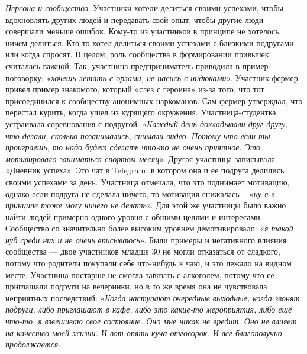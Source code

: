 \documentclass[pdflatex,sn-mathphys-num]{sn-jnl}%
\theoremstyle{thmstyleone}%
\theoremstyle{thmstyletwo}%
\theoremstyle{thmstylethree}%
\begin{document}
\textit{Персона и сообщество}. Участники хотели делиться своими успехами, чтобы вдохновлять других людей и передавать свой опыт, чтобы другие люди совершали меньше ошибок. Кому-то из участников в принципе не хотелось ничем делиться. Кто-то хотел делиться своими успехами с близкими подругами или когда спросят. В целом, роль сообщества в формировании привычек считалась важной. Так, участница-предприниматель приводила в пример поговорку: «\textit{хочешь летать с орлами, не пасись с индюками}». Участник-фермер привел пример знакомого, который «слез с героина» из-за того, что тот присоединился к сообществу анонимных наркоманов. Сам фермер утверждал, что перестал курить, когда ушел из курящего окружения. Участница-студентка устраивала соревнования с подругой: «\textit{Каждый день докладывали друг другу, что делали, сколько позанимались, снимали видео. Потому что если ты проиграешь, то надо будет сделать что-то не очень приятное. Это мотивировало заниматься спортом месяц}». Другая участница записывала «Дневник успеха». Это чат в Telegram, в котором она и ее подруга делились своими успехами за день. Участница отмечала, что это поднимает мотивацию, однако если подруга не сделала ничего, то мотивация снижалась – «\textit{ну я в принципе тоже могу ничего не делать}». Для этой же участницы было важно найти людей примерно одного уровня с общими целями и интересами. Сообщество со значительно более высоким уровнем демотивировало: «\textit{я такой нуб среди них и не очень вписываюсь}». Были примеры и негативного влияния сообщества — двое участников младше 30 не могли отказаться от сладкого, потому что родители покупали себе что-нибудь к чаю, и это лежало на видном месте. Участница постарше не смогла завязать с алкоголем, потому что ее приглашали подруги на вечеринки, но в то же время она не чувствовала неприятных последствий: «\textit{Когда наступают очередные выходные, когда звонят подруги, либо приглашают в кафе, либо это какие-то мероприятия, либо ещё что-то, я взвешиваю свое состояние. Оно мне никак не вредит. Оно не влияет на качество моей жизни. И вот опять куча отговорок. И все благополучно продолжается}.
\end{document}
